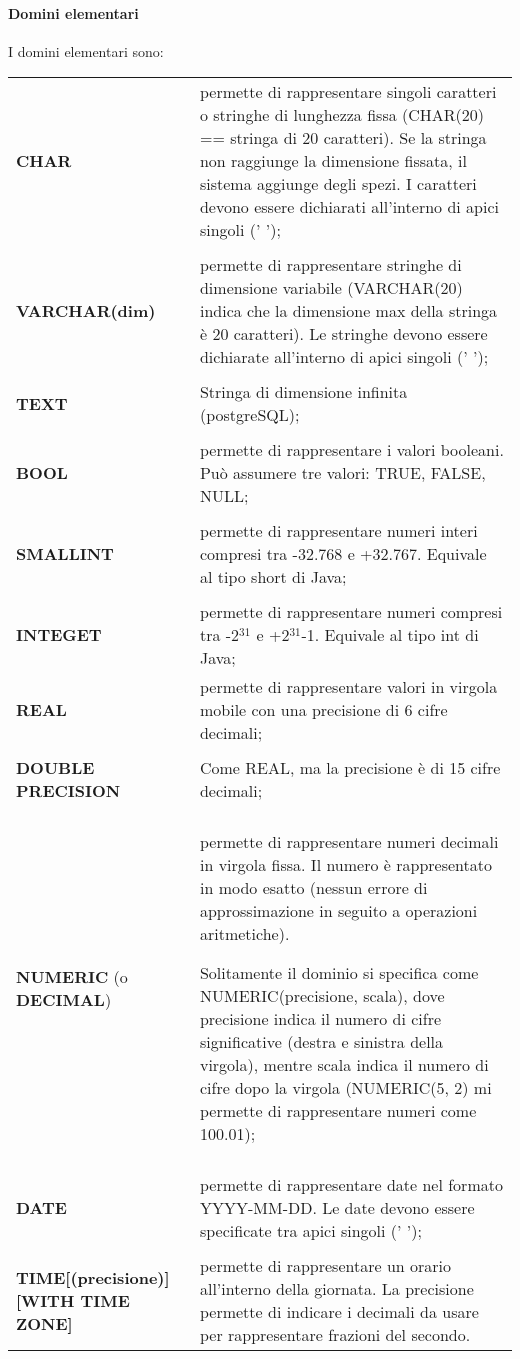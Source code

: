 \documentclass[a4paper, 10pt]{report}
\begin{document}
\paragraph*{Domini elementari} I domini elementari sono:
\begin{longtable}{ p{}  p{}}
\textbf{CHAR} & permette di rappresentare singoli caratteri o stringhe di lunghezza fissa (CHAR(20) == stringa di 20 caratteri). Se la stringa non raggiunge la dimensione fissata, il sistema aggiunge degli spezi. I caratteri devono essere dichiarati all'interno di apici singoli (' ');
\\\\
\textbf{VARCHAR(dim)} & permette di rappresentare stringhe di dimensione variabile (VARCHAR(20) indica che la dimensione max della stringa è 20 caratteri). Le stringhe devono essere dichiarate all'interno di apici singoli (' ');
\\\\
\textbf{TEXT} & Stringa di dimensione infinita (postgreSQL);
\\\\
 \textbf{BOOL} & permette di rappresentare i valori booleani. Può assumere tre valori: TRUE, FALSE, NULL;
 \\\\
 \textbf{SMALLINT} & permette di rappresentare numeri interi compresi tra -32.768 e +32.767. Equivale al tipo short di Java;
\\\\
 \textbf{INTEGET} & permette di rappresentare numeri compresi tra -2$^{31}$ e +2$^{31}$-1. Equivale al tipo int di Java;
 \vspace{0.2cm}
\\
 \textbf{REAL} & permette di rappresentare valori in virgola mobile con una precisione di 6 cifre decimali;
\\\\
 \textbf{DOUBLE PRECISION} & Come REAL, ma la precisione è di 15 cifre decimali;
\\\\
 \textbf{NUMERIC} (o \textbf{DECIMAL}) & permette di rappresentare numeri decimali in virgola fissa. Il numero è rappresentato in modo esatto (nessun errore di approssimazione in seguito a operazioni aritmetiche). 
 
Solitamente il dominio si specifica come NUMERIC(precisione, scala), dove precisione indica il numero di cifre significative (destra e sinistra della virgola), mentre scala indica il numero di cifre dopo la virgola (NUMERIC(5, 2) mi permette di rappresentare numeri come 100.01);
\\\\
 \textbf{DATE} & permette di rappresentare date nel formato YYYY-MM-DD. Le date devono essere specificate tra apici singoli (' ');
\\\\
 \textbf{TIME[(precisione)][WITH TIME ZONE]} &  permette di rappresentare un orario all'interno della giornata. La precisione permette di indicare i decimali da usare per rappresentare frazioni del secondo. 
 

\end{longtable}
\end{document}
